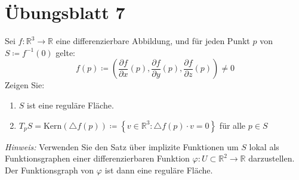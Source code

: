 \section{Übungsblatt 7}
\setcounter{problemcounter}{0}

\begin{assignment}
  Sei \( f: \mathbb{R}^3 \to \mathbb{R} \) eine differenzierbare Abbildung, und für jeden Punkt \( p \) von \( S \coloneqq f^{ -1 }(0) \) gelte:
  \begin{equation*}
    f(p) \coloneqq \left(\frac{\partial f}{\partial x}(p), 
    \frac{\partial f}{\partial y}(p), 
    \frac{\partial f}{\partial z}(p) \right) \neq 0
  \end{equation*}
  Zeigen Sie: 
  \begin{enumerate}[label= (\alph*)] 
    \item \( S \) ist eine reguläre Fläche.
    \item \( T_p S = \text{Kern}(\triangle f(p)) \coloneqq \left \{ v \in \mathbb{R}^3 : \triangle f(p) \cdot v = 0 \right \} \) für alle \( p \in S \) 
  \end{enumerate}
  \emph{Hinweis:} Verwenden Sie den Satz über implizite Funktionen um \( S \) lokal als Funktionsgraphen einer differenzierbaren Funktion \( \varphi : U \subset \mathbb{R}^2 \to \mathbb{R} \) darzustellen. Der Funktionsgraph von \( \varphi \) ist dann eine reguläre Fläche.
\end{assignment}
